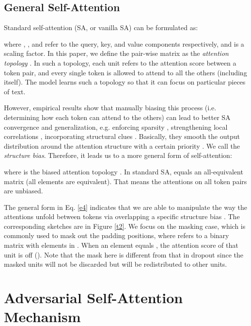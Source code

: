 \documentclass[letterpaper]{article} \usepackage{aaai23}  \usepackage{times}  \usepackage{helvet}  \usepackage{courier}  \usepackage[hyphens]{url}  \usepackage{graphicx} \urlstyle{rm} \def\UrlFont{\rm}  \usepackage{natbib}  \usepackage{caption} \frenchspacing  \setlength{\pdfpagewidth}{8.5in}  \setlength{\pdfpageheight}{11in}  \usepackage{algorithm}
\begin{document}
\subsection{General Self-Attention}

Standard self-attention (SA, or vanilla SA) \citep{DBLP:conf/nips/VaswaniSPUJGKP17} can be formulated as:

where , , and  refer to the query, key, and value components respectively, and  is a scaling factor. In this paper, we define the pair-wise matrix  as the \textit{attention topology} . In such a topology, each unit refers to the attention score between a token pair, and every single token is allowed to attend to all the others (including itself). The model learns such a topology so that it can focus on particular pieces of text.

However, empirical results show that manually biasing this process (i.e. determining how each token can attend to the others) can lead to better SA convergence and generalization, e.g. enforcing sparsity \citep{DBLP:conf/icml/ShiGRXLLK21}, strengthening local correlations \citep{DBLP:conf/acl/YouSI20}, incorporating structural clues \citep{DBLP:conf/acl/WuZZ21}. Basically, they smooth the output distribution around the attention structure with a certain priority . We call  the \textit{structure bias}. Therefore, it leads us to a more general form of self-attention:

where  is the biased attention topology . In standard SA,  equals an all-equivalent matrix (all elements are equivalent). That means the attentions on all token pairs are unbiased.

The general form in Eq. \ref{e4} indicates that we are able to manipulate the way the attentions unfold between tokens via overlapping a specific structure bias . The corresponding sketches are in Figure \ref{t2}. We focus on the masking case, which is commonly used to mask out the padding positions, where  refers to a binary matrix with elements in . When an element equals , the attention score of that unit is off (). Note that the mask here is different from that in dropout \citep{DBLP:journals/jmlr/SrivastavaHKSS14} since the masked units will not be discarded but will be redistributed to other units.


\section{Adversarial Self-Attention Mechanism}
\label{s3}
\end{document}
